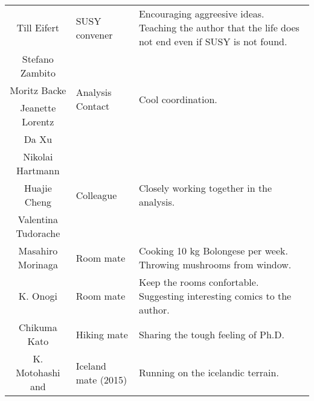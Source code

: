 \begin{table}[h]
\begin{tabularx}{\linewidth}{clX}
    \hline        
    Till Eifert        &   SUSY convener                             &  Encouraging aggreesive ideas. Teaching the author that the life does not end even if SUSY is not found.  \\   
    Stefano Zambito    &   \multirow{4}{*}{Analysis Contact}         &  \multirow{4}{*}{Cool coordination.}   \\   
    Moritz Backe       &                            &     \\   
    Jeanette Lorentz   &            &     \\   
    Da Xu              &            &     \\   
    Nikolai Hartmann   &   \multirow{3}{*}{Colleague}                                         &  \multirow{3}{*}{Closely working together in the analysis.}   \\   
    Huajie Cheng       &                                                                      &     \\   
    Valentina Tudorache&                                                                      &     \\   
    \hline        
    Masahiro Morinaga  &   Room mate                                                                      &  Cooking 10 kg Bolongese per week. Throwing mushrooms from window.   \\   
    K. Onogi           &   Room mate                                                                      &  Keep the rooms confortable. Suggesting interesting comics to the author.   \\   
    Chikuma Kato       &   Hiking mate                                                                    &  Sharing the tough feeling of Ph.D.   \\   
    K. Motohashi and    &   \multirow{2}{*}{Iceland mate (2015)}                                      &  \multirow{2}{*}{Running on the icelandic terrain.}   \\   

\end{tabularx}
\end{table}
